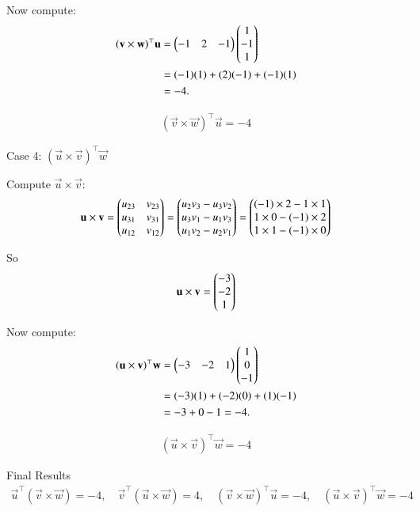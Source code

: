 \documentclass[journal]{IEEEtran}
\begin{document}
Now compute:
\begin{align}
(\mathbf{v}\times \mathbf{w})^\top \mathbf{u} &= \begin{pmatrix}-1 & 2 & -1\end{pmatrix}\begin{pmatrix}1 \\ -1 \\ 1\end{pmatrix} \\
&= (-1)(1) + (2)(-1) + (-1)(1) \\
&= -4.
\end{align}

\begin{align}
\boxed{(\vec{v}\times \vec{w})^\top \vec{u} = -4}
\end{align}

Case 4: $(\vec{u} \times \vec{v})^\top \vec{w}$

Compute $\vec{u} \times \vec{v}$:
\begin{align}
\mathbf{u} \times \mathbf{v} =
\begin{pmatrix}
u_{23} & v_{23} \\
u_{31} & v_{31} \\
u_{12} & v_{12}
\end{pmatrix}
=
\begin{pmatrix}
u_2 v_3 - u_3 v_2 \\
u_3 v_1 - u_1 v_3 \\
u_1 v_2 - u_2 v_1
\end{pmatrix}
=
\begin{pmatrix}
(-1) \times 2 - 1 \times 1 \\
1 \times 0 - (-1) \times 2 \\
1 \times 1 - (-1) \times 0
\end{pmatrix}
\end{align}

So
\begin{align}
\mathbf{u}\times \mathbf{v} =\begin{pmatrix}-3 \\ -2 \\ 1\end{pmatrix}
\end{align}

Now compute:
\begin{align}
(\mathbf{u}\times \mathbf{v})^\top \mathbf{w} &= \begin{pmatrix}-3 & -2 & 1\end{pmatrix}\begin{pmatrix}1 \\ 0 \\ -1\end{pmatrix} \\
&= (-3)(1) + (-2)(0) + (1)(-1) \\
&= -3 + 0 - 1 = -4.
\end{align}

\begin{align}
\boxed{(\vec{u}\times \vec{v})^\top \vec{w} = -4}
\end{align}

Final Results
\begin{align}
\vec{u}^\top(\vec{v}\times \vec{w})=-4,\quad
\vec{v}^\top(\vec{u}\times \vec{w})=4,\quad
(\vec{v}\times \vec{w})^\top \vec{u}=-4,\quad
(\vec{u}\times \vec{v})^\top \vec{w}=-4
\end{align}
\end{document}
